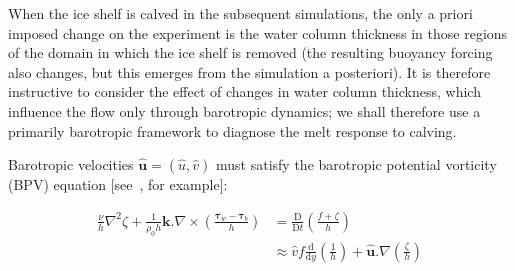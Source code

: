 \documentclass[draft]{agujournal2019}
\begin{document}

When the ice shelf is calved in the subsequent simulations, the only a priori imposed change on the experiment is the water column thickness in those regions of the domain in which the ice shelf is removed (the resulting buoyancy forcing also changes, but this emerges from the simulation a posteriori). It is therefore instructive to consider the effect of changes in water column thickness, which influence the flow only through barotropic dynamics; we shall therefore use a primarily barotropic framework to diagnose the melt response to calving. 

Barotropic velocities $\hat{\mathbf{u}} = (\hat{u}, \hat{v})$ must satisfy the barotropic potential vorticity (BPV) equation [see~, for example]:
\begin{linenomath*}
 \begin{align}
 \frac{\nu}{h}\nabla^2 \zeta + \frac{1}{\rho_0 h}\mathbf{k} . \nabla \times \left( \frac{\mathbf{\tau}_w - \mathbf{\tau}_b}{h}\right) &= \frac{\mathrm{D}}{\mathrm{D}t}\left( \frac{f + \zeta}{h}\right) \label{E:BPVeq} \\ &\approx  \hat{v} f  \frac{\mathrm{d}}{\mathrm{d}y} \left(\frac{1}{h}\right) + \hat{\mathbf{u}}.\nabla \left(\frac{\zeta}{h}\right) \label{E:BPVeq2}
 \end{align}
 \end{linenomath*}
\end{document}

